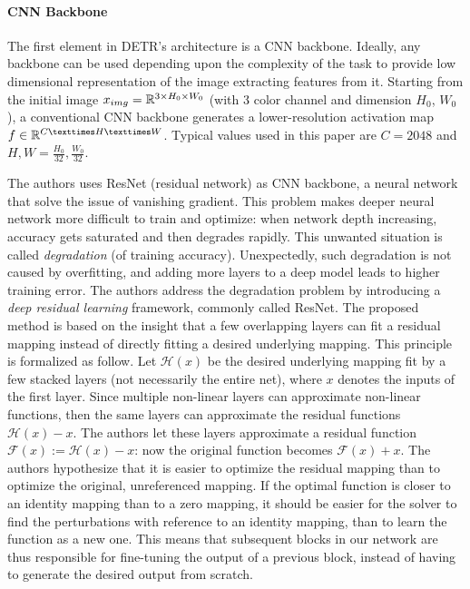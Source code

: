 \paragraph{CNN Backbone} The first element in DETR's architecture is a CNN backbone.  Ideally, any backbone can be used depending upon the complexity of the task to provide low dimensional representation of the image extracting features from it. Starting from the initial image $x_{img} = \mathbb{R}^{3\times H_0\times W_0}$ (with 3 color channel and dimension $H_0$, $W_0$), a conventional CNN backbone generates a lower-resolution activation map $f \in \R^{C×H×W}$. Typical values used in this paper are $C = 2048$ and $H, W = \frac{H_0}{32}, \frac{W_0}{32}$. 

The authors uses ResNet (residual network) \cite{resnet} as CNN backbone, a neural network that solve the issue of vanishing gradient. This problem makes deeper neural network more difficult to train and optimize: when network depth increasing, accuracy gets saturated and then degrades rapidly. This unwanted situation is called \textit{degradation} (of training accuracy). Unexpectedly, such degradation is not caused by overfitting, and adding
more layers to a deep model leads to higher training error. The authors address the degradation problem by introducing a \textit{deep residual learning} framework, commonly called ResNet. The proposed method is based on the insight that a few overlapping layers can fit a residual mapping instead of directly fitting a desired underlying mapping. This principle is formalized as follow. Let $\mathcal{H}(x)$ be the desired underlying mapping fit by a few stacked layers (not necessarily the entire net), where $x$ denotes the inputs of the first layer. Since multiple non-linear layers can approximate  non-linear functions, then  the same layers can approximate the residual functions $\mathcal{H}(x) - x$. The authors let these layers approximate a residual function
$\mathcal{F}(x) := \mathcal{H}(x) - x$:  now the original function becomes
$\mathcal{F}(x)+x$. The authors hypothesize that it is easier to optimize the residual mapping than to optimize the original, unreferenced mapping.  If the optimal function is closer to an identity
mapping than to a zero mapping, it should be easier for the
solver to find the perturbations with reference to an identity
mapping, than to learn the function as a new one. This means that subsequent blocks in our network are thus responsible for fine-tuning the output of a previous block, instead of having to generate the desired output from scratch.

